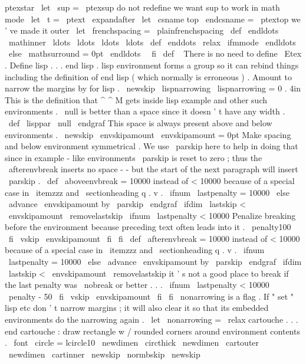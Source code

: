 {{{{ptexstar
%
\
let
\
sup
=
\
ptexsup
%
do
not
redefine
we
want
sup
to
work
in
math
mode
\
let
\
t
=
\
ptext
\
expandafter
\
let
\
csname
top
\
endcsname
=
\
ptextop
%
we
'
ve
made
it
outer
\
let
\
frenchspacing
=
\
plainfrenchspacing
%
\
def
\
endldots
{
\
mathinner
{
\
ldots
\
ldots
\
ldots
\
ldots
}
}
%
\
def
\
enddots
{
\
relax
\
ifmmode
\
endldots
\
else
\
mathsurround
=
0pt
\
endldots
\
\
fi
}
%
\
def
\
{
}
%
}
%
There
is
no
need
to
define
\
Etex
.
%
Define
lisp
.
.
.
end
lisp
.
%
lisp
environment
forms
a
group
so
it
can
rebind
things
%
including
the
definition
of
end
lisp
(
which
normally
is
erroneous
)
.
%
Amount
to
narrow
the
margins
by
for
lisp
.
\
newskip
\
lispnarrowing
\
lispnarrowing
=
0
.
4in
%
This
is
the
definition
that
^
^
M
gets
inside
lisp
example
and
other
%
such
environments
.
\
null
is
better
than
a
space
since
it
doesn
'
t
%
have
any
width
.
\
def
\
lisppar
{
\
null
\
endgraf
}
%
This
space
is
always
present
above
and
below
environments
.
\
newskip
\
envskipamount
\
envskipamount
=
0pt
%
Make
spacing
and
below
environment
symmetrical
.
We
use
\
parskip
here
%
to
help
in
doing
that
since
in
example
-
like
environments
\
parskip
%
is
reset
to
zero
;
thus
the
\
afterenvbreak
inserts
no
space
-
-
but
the
%
start
of
the
next
paragraph
will
insert
\
parskip
.
%
\
def
\
aboveenvbreak
{
{
%
%
=
10000
instead
of
<
10000
because
of
a
special
case
in
\
itemzzz
and
%
\
sectionheading
q
.
v
.
\
ifnum
\
lastpenalty
=
10000
\
else
\
advance
\
envskipamount
by
\
parskip
\
endgraf
\
ifdim
\
lastskip
<
\
envskipamount
\
removelastskip
\
ifnum
\
lastpenalty
<
10000
%
Penalize
breaking
before
the
environment
because
preceding
text
%
often
leads
into
it
.
\
penalty100
\
fi
\
vskip
\
envskipamount
\
fi
\
fi
}
}
\
def
\
afterenvbreak
{
{
%
%
=
10000
instead
of
<
10000
because
of
a
special
case
in
\
itemzzz
and
%
\
sectionheading
q
.
v
.
\
ifnum
\
lastpenalty
=
10000
\
else
\
advance
\
envskipamount
by
\
parskip
\
endgraf
\
ifdim
\
lastskip
<
\
envskipamount
\
removelastskip
%
it
'
s
not
a
good
place
to
break
if
the
last
penalty
was
\
nobreak
%
or
better
.
.
.
\
ifnum
\
lastpenalty
<
10000
\
penalty
-
50
\
fi
\
vskip
\
envskipamount
\
fi
\
fi
}
}
%
\
nonarrowing
is
a
flag
.
If
"
set
"
lisp
etc
don
'
t
narrow
margins
;
it
will
%
also
clear
it
so
that
its
embedded
environments
do
the
narrowing
again
.
\
let
\
nonarrowing
=
\
relax
%
cartouche
.
.
.
end
cartouche
:
draw
rectangle
w
/
rounded
corners
around
%
environment
contents
.
\
font
\
circle
=
lcircle10
\
newdimen
\
circthick
\
newdimen
\
cartouter
\
newdimen
\
cartinner
\
newskip
\
normbskip
\
newskip
\
}}}
